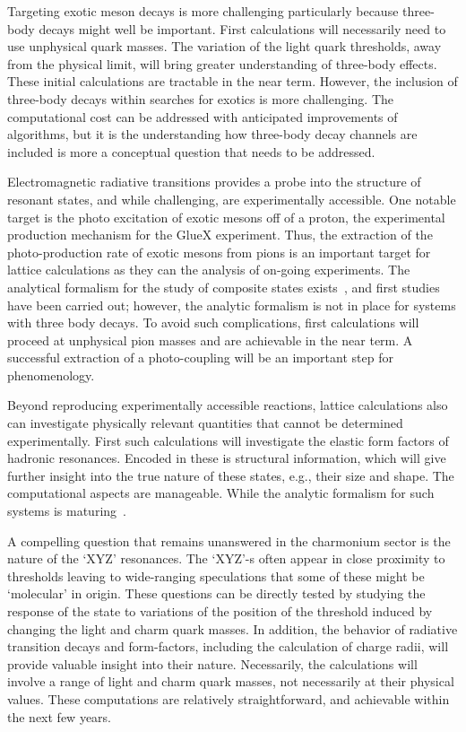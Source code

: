 Targeting exotic meson decays is more challenging particularly because three-body decays might well be important. First calculations will necessarily need to use unphysical quark masses. The variation of the light quark thresholds, away from the physical limit, will bring greater understanding of three-body effects. These initial calculations are tractable in the near term. However, the inclusion of three-body decays within searches for exotics is more challenging. The computational cost can be addressed with anticipated improvements of algorithms, but it is the understanding how three-body decay channels are included is more a conceptual question that needs to be addressed.


Electromagnetic radiative transitions provides a probe into the structure of resonant states, and while challenging, are experimentally accessible. 
One notable target is the photo excitation of exotic mesons off of a proton, the experimental production mechanism for the GlueX experiment. Thus, the extraction of the photo-production rate of exotic mesons from pions is an important target for lattice calculations as they can the analysis of on-going experiments. The analytical formalism for the study of composite states exists~\cite{Briceno:2015tza}, and first studies have been carried out; however, the analytic formalism is not in place for systems with three body decays. To avoid such complications, first calculations will proceed at unphysical pion masses and are achievable in the near term. A successful extraction of a photo-coupling will be an important step for phenomenology.

Beyond reproducing experimentally accessible reactions, lattice calculations also can investigate physically relevant quantities that cannot be determined experimentally. First such calculations will investigate the elastic form factors of hadronic resonances. Encoded in these is structural information, which will give further insight into the true nature of these states, e.g., their size and shape. The computational aspects are manageable. While the analytic formalism for such systems is maturing~\cite{Briceno:2015tza,Baroni:2018unx}.


A compelling question that remains unanswered in the charmonium sector is the nature of the `XYZ' resonances. The `XYZ'-s often appear in close proximity to thresholds leaving to wide-ranging speculations that some of these might be `molecular' in origin. These questions can be directly tested by studying the response of the state to variations of the position of the threshold induced by changing the light and charm quark masses. In addition, the behavior of radiative transition decays and form-factors, including the calculation of charge radii, will provide valuable insight into their nature. Necessarily, the calculations will involve a range of light and charm quark masses, not necessarily at their physical values.  These computations are relatively straightforward, and achievable within the next few years. 


